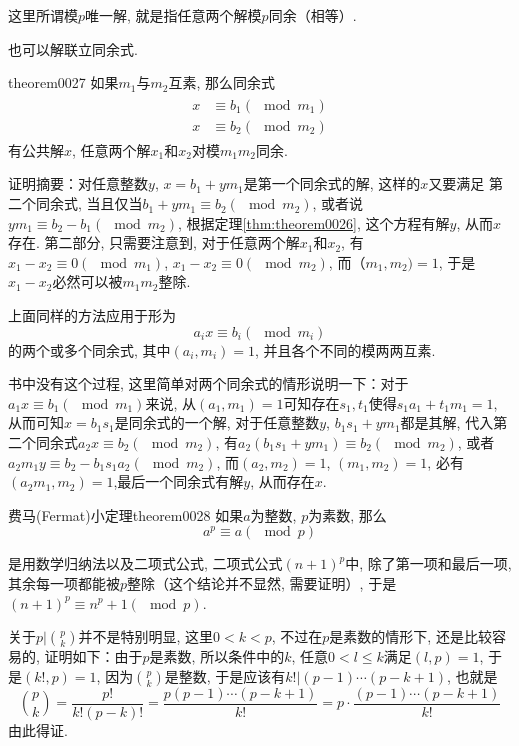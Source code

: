 这里所谓模$p$唯一解, 就是指任意两个解模$p$同余（相等）. 

也可以解联立同余式. 
\begin{theorem}{}{theorem0027}
如果$m_1$与$m_2$互素, 那么同余式
\begin{gather}
\begin{aligned}
x &\equiv b_1 (\mod{m_1}) \\
x &\equiv b_2 (\mod{m_2})
\end{aligned}
\end{gather}
有公共解$x$, 任意两个解$x_1$和$x_2$对模$m_1m_2$同余. 
\end{theorem}

证明摘要：对任意整数$y$, $x = b_1 + ym_1$是第一个同余式的解, 这样的$x$又要满足 第二个同余式, 当且仅当$b_1+ym_1 \equiv b_2(\mod{m_2})$, 或者说$ym_1 \equiv b_2-b_1 (\mod{m_2})$, 根据定理\ref{thm:theorem0026}, 这个方程有解$y$, 从而$x$存在. 第二部分, 只需要注意到, 对于任意两个解$x_1$和$x_2$, 有$x_1-x_2 \equiv 0(\mod{m_1})$, $x_1-x_2 \equiv 0 (\mod{m_2})$, 而$（m_1, m_2) = 1$, 于是$x_1-x_2$必然可以被$m_1m_2$整除. 

上面同样的方法应用于形为
\[
a_ix \equiv b_i (\mod{m_i})
\]
的两个或多个同余式, 其中$(a_i, m_i)=1$, 并且各个不同的模两两互素. 

书中没有这个过程, 这里简单对两个同余式的情形说明一下：对于$a_1x \equiv b_1(\mod{m_1})$来说, 从$(a_1, m_1)=1$可知存在$s_1,t_1$使得$s_1a_1+t_1m_1=1$, 从而可知$x = b_1s_1$是同余式的一个解, 对于任意整数$y$, $b_1s_1+ym_1$都是其解, 代入第二个同余式$a_2x \equiv b_2(\mod{m_2})$, 有$a_2(b_1s_1 + ym_1) \equiv b_2(\mod{m_2})$, 或者$a_2m_1y \equiv b_2 - b_1s_1a_2 (\mod{m_2})$, 而$(a_2, m_2)=1$, $(m_1, m_2)=1$, 必有$(a_2m_1, m_2)=1$,最后一个同余式有解$y$, 从而存在$x$. 

\begin{theorem}{费马(Fermat)小定理}{theorem0028}
如果$a$为整数, $p$为素数, 那么
\[
a^p \equiv a(\mod{p})
\]
\end{theorem}

是用数学归纳法以及二项式公式, 二项式公式$(n+1)^p$中, 除了第一项和最后一项, 其余每一项都能被$p$整除（这个结论并不显然, 需要证明）, 于是$(n+1)^p \equiv n^p + 1(\mod{p})$. 

关于$p | {p \choose k}$并不是特别明显, 这里$0 < k < p$, 不过在$p$是素数的情形下, 还是比较容易的, 证明如下：由于$p$是素数, 所以条件中的$k$, 任意$0 < l \le k$满足$(l, p)=1$, 于是$(k!, p)=1$, 因为$p \choose k$是整数, 于是应该有$k!|(p-1)\cdots(p-k+1)$, 也就是
\[
\binom{p}{k} = \frac{p!}{k!(p-k)!} = \frac{p(p-1)\cdots(p-k+1)}{k!} = p \cdot \frac{(p-1)\cdots(p-k+1)}{k!}
\]
由此得证. 


